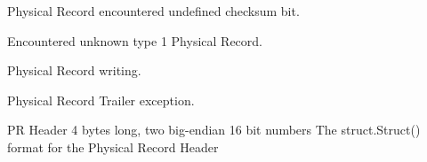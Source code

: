 \documentclass[letterpaper,10pt,english]{sphinxmanual}
\begin{document}

\begin{fulllineitems}
\label{\detokenize{ref/LIS/core/PhysRec:TotalDepth.LIS.core.PhysRec.ExceptionPhysRecUndefinedChecksum}}
Physical Record encountered undefined checksum bit.

\end{fulllineitems}


\begin{fulllineitems}
\label{\detokenize{ref/LIS/core/PhysRec:TotalDepth.LIS.core.PhysRec.ExceptionPhysRecUnknownType}}
Encountered unknown type 1 Physical Record.

\end{fulllineitems}


\begin{fulllineitems}
\label{\detokenize{ref/LIS/core/PhysRec:TotalDepth.LIS.core.PhysRec.ExceptionPhysRecWrite}}
Physical Record writing.

\end{fulllineitems}


\begin{fulllineitems}
\label{\detokenize{ref/LIS/core/PhysRec:TotalDepth.LIS.core.PhysRec.ExceptionPhysRecTail}}
Physical Record Trailer exception.

\end{fulllineitems}


\begin{fulllineitems}
\label{\detokenize{ref/LIS/core/PhysRec:TotalDepth.LIS.core.PhysRec.PR_PRH_LEN_FORMAT}}
PR Header 4 bytes long, two big-endian 16 bit numbers
The struct.Struct() format for the Physical Record Header

\end{fulllineitems}
\end{document}
